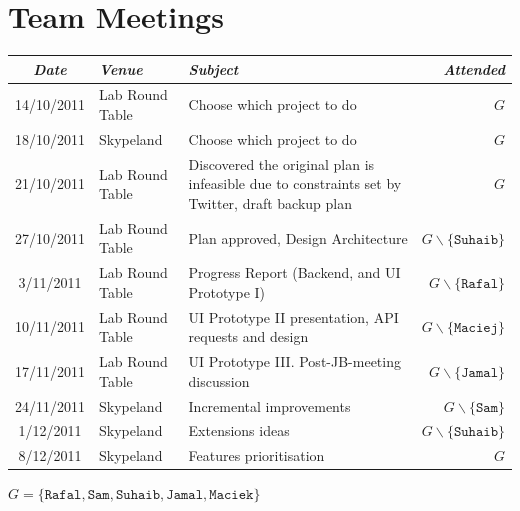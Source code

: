 \documentclass{report}
\begin{document}
	\appendix
	\chapter{Team Meetings}
	\begin{tabular}{c | l p{7cm} r}
    \emph{\large Date} &  \emph{\large Venue} &  \emph{\large Subject} &  \emph{\large Attended}\\
    \hline
    14/10/2011 & Lab Round Table & Choose which project to do & \(G\)\\
    18/10/2011 & Skypeland & Choose which project to do & \(G\)\\
    21/10/2011 & Lab Round Table & Discovered the original plan is infeasible due to constraints set by Twitter, draft backup plan & \(G\)\\
    27/10/2011 & Lab Round Table & Plan approved, Design Architecture & \(G \smallsetminus \{\texttt{Suhaib}\}\)\\
    3/11/2011 & Lab Round Table & Progress Report (Backend, and UI Prototype I) & \(G \smallsetminus \{\texttt{Rafal}\}\)\\
    10/11/2011 & Lab Round Table & UI Prototype II presentation, API requests and design & \(G \smallsetminus \{\texttt{Maciej}\}\)\\
    17/11/2011 & Lab Round Table & UI Prototype III. Post-JB-meeting discussion & \(G \smallsetminus \{\texttt{Jamal}\}\)\\
    24/11/2011 & Skypeland & Incremental improvements & \(G \smallsetminus \{\texttt{Sam}\}\)\\
    1/12/2011 & Skypeland & Extensions ideas & \(G \smallsetminus \{\texttt{Suhaib}\}\)\\
    8/12/2011 & Skypeland & Features prioritisation & \(G\)\\
  \end{tabular}

  \(G=\{\texttt{Rafal}, \texttt{Sam}, \texttt{Suhaib}, \texttt{Jamal}, \texttt{Maciek}\}\)\\


	
\end{document}
